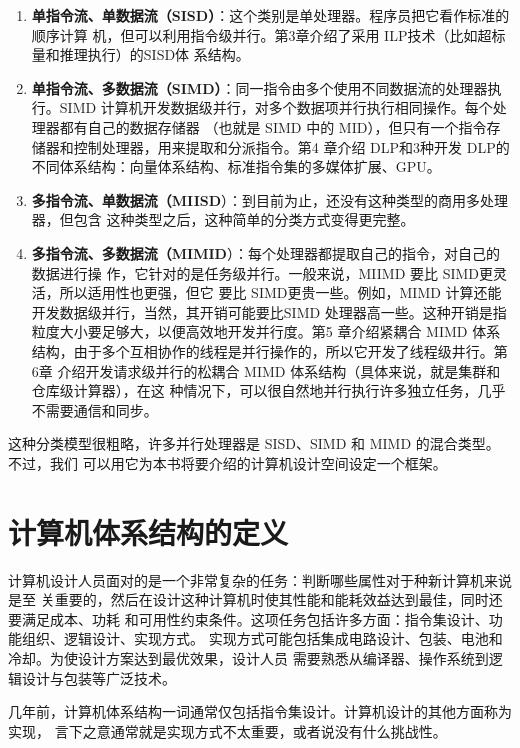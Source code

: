 \begin{enumerate}
    \item \textbf{单指令流、单数据流（SISD）}：这个类别是单处理器。程序员把它看作标准的顺序计算
    机，但可以利用指令级并行。第3章介绍了采用 ILP技术（比如超标量和推理执行）的SISD体
    系结构。
    \item \textbf{单指令流、多数据流（SIMD）}：同一指令由多个使用不同数据流的处理器执行。SIMD
    计算机开发数据级并行，对多个数据项并行执行相同操作。每个处理器都有自己的数据存储器
    （也就是 SIMD 中的 MID），但只有一个指令存储器和控制处理器，用来提取和分派指令。第4
    章介绍 DLP和3种开发 DLP的不同体系结构：向量体系结构、标准指令集的多媒体扩展、GPU。
    \item \textbf{多指令流、单数据流（MIISD}）：到目前为止，还没有这种类型的商用多处理器，但包含
    这种类型之后，这种简单的分类方式变得更完整。
    \item \textbf{多指令流、多数据流（MIMID}）：每个处理器都提取自己的指令，对自己的数据进行操
    作，它针对的是任务级并行。一般来说，MIIMD 要比 SIMD更灵活，所以适用性也更强，但它
    要比 SIMD更贵一些。例如，MIMD 计算还能开发数据级并行，当然，其开销可能要比SIMD
    处理器高一些。这种开销是指粒度大小要足够大，以便高效地开发并行度。第5 章介绍紧耦合
    MIMD 体系结构，由于多个互相协作的线程是并行操作的，所以它开发了线程级井行。第6章
    介绍开发请求级并行的松耦合 MIMD 体系结构（具体来说，就是集群和仓库级计算器），在这
    种情况下，可以很自然地并行执行许多独立任务，几乎不需要通信和同步。
\end{enumerate}

这种分类模型很粗略，许多并行处理器是 SISD、SIMD 和 MIMD 的混合类型。不过，我们
可以用它为本书将要介绍的计算机设计空间设定一个框架。

\section{计算机体系结构的定义}

计算机设计人员面对的是一个非常复杂的任务：判断哪些属性对于种新计算机来说是至
关重要的，然后在设计这种计算机时使其性能和能耗效益达到最佳，同时还要满足成本、功耗
和可用性约束条件。这项任务包括许多方面：指令集设计、功能组织、逻辑设计、实现方式。
实现方式可能包括集成电路设计、包装、电池和冷却。为使设计方案达到最优效果，设计人员
需要熟悉从编译器、操作系统到逻辑设计与包装等广泛技术。

几年前，计算机体系结构一词通常仅包括指令集设计。计算机设计的其他方面称为实现，
言下之意通常就是实现方式不太重要，或者说没有什么挑战性。

